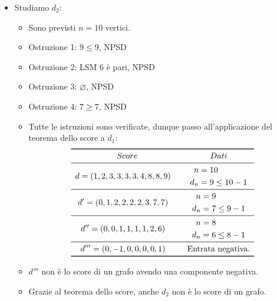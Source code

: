 \documentclass[10pt]{article}
\begin{document}
\begin{itemize}
	\item
	Studiamo $d_2$:
	\begin{itemize}
	\item
	Sono previsti $n=10$ vertici.
	\item
	Ostruzione 1: $9 \leq 9$, NPSD
	\item
	Ostruzione 2: LSM $6$ è pari, NPSD
	\item
	Ostruzione 3: $\varnothing$, NPSD
	\item
	Ostruzione 4: $7 \geq 7$, NPSD
	\item
	Tutte le istruzioni sono verificate, dunque passo all'applicazione del teorema dello score a $d_1$:
	\[
	\begin{array}{cc}
		\toprule
		Score & Dati \\
		\midrule
		\begin{split} d &= (1,2,3,3,3,3,4,8,8,9) \end{split} & \begin{split} n &= 10 \\ d_n &= 9 \leq 10 -1 \end{split} \\
		\midrule
		\begin{split} d' &= (0,1,2,2,2,2,3,7,7) \end{split} & \begin{split} n &= 9 \\ d_n &= 7 \leq 9 -1 \end{split} \\
		\midrule
		\begin{split} d'' &= (0,0,1,1,1,1,2,6) \end{split} & \begin{split} n &= 8 \\ d_n &= 6 \leq 8 -1 \end{split} \\
		\midrule
		\begin{split} d''' &= (0,-1,0,0,0,0,1) \end{split} & \textrm{Entrata negativa.} \\
		\bottomrule
	\end{array}
	\]
	\item
	$d'''$ non è lo score di un grafo avendo una componente negativa.
	\item
	Grazie al teorema dello score, anche $d_2$ non è lo score di un grafo.
	\end{itemize}
	\end{itemize}
\end{document}
